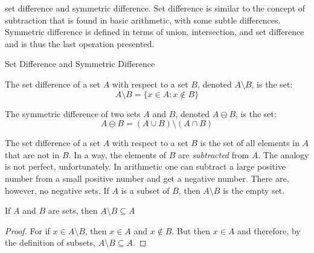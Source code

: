 \documentclass[crop=false,class=book,oneside]{standalone}                      %
\begin{document}
            set difference and symmetric difference. Set
            difference is similar to the concept of subtraction
            that is found in basic arithmetic, with some subtle
            differences. Symmetric difference is defined in terms
            of union, intersection, and set difference and is
            thus the last operation presented.
            \begin{fdefinition*}
                  {Set Difference and Symmetric Difference}{}
                \begin{definition}
                    The set difference of a set $A$ with respect
                    to a set $B$, denoted $A\setminus{B}$,
                    is the set:
                    \begin{equation*}
                        A\setminus{B}=
                        \{x\in{A}:x\notin{B}\}
                    \end{equation*}
                \end{definition}
                \begin{definition}
                    The symmetric difference of two sets $A$ and
                    $B$, denoted $A\ominus{B}$, is the set:
                    \begin{equation*}
                        A\ominus{B}=
                        (A\cup{B})\setminus(A\cap{B})
                    \end{equation*}
                \end{definition}
            \end{fdefinition*}
            The set difference of a set $A$ with respect to a
            set $B$ is the set of all elements in $A$ that are
            not in $B$. In a way, the elements of $B$ are
            \textit{subtracted} from $A$. The analogy is not
            perfect, unfortunately. In arithmetic one
            can subtract a large positive number from a small
            positive number and get a \textrm{negative} number.
            There are, however, no negative sets. If $A$ is a
            subset of $B$, then $A\setminus{B}$ is the empty set.
            \begin{theorem}
                \label{thm:ELEM_ALG:Subset_of_Set_Difference}
                If $A$ and $B$ are sets, then
                $A\setminus{B}\subseteq{A}$
            \end{theorem}
            \begin{proof}
                For if $x\in{A}\setminus{B}$, then
                $x\in{A}$ and $x\notin{B}$. But then
                $x\in{A}$ and therefore, by
                the definition of subsets,
                $A\setminus{B}\subseteq{A}$.
            \end{proof}
\end{document}
